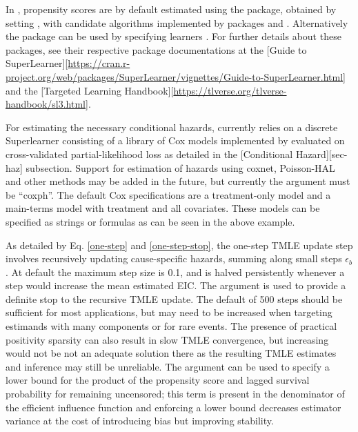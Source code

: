 In , propensity scores are by default estimated using the  package, obtained by setting , with candidate algorithms  implemented by packages  and . Alternatively the  package can be used by specifying learners . For further details about these packages, see their respective package documentations at the {[}Guide to SuperLearner{]}{[}\url{https://cran.r-project.org/web/packages/SuperLearner/vignettes/Guide-to-SuperLearner.html}{]} and the {[}Targeted Learning Handbook{]}{[}\url{https://tlverse.org/tlverse-handbook/sl3.html}{]}.

For estimating the necessary conditional hazards,  currently relies on a discrete Superlearner consisting of a library of Cox models implemented by  evaluated on cross-validated partial-likelihood loss as detailed in the {[}Conditional Hazard{]}{[}sec-haz{]} subsection. Support for estimation of hazards using coxnet, Poisson-HAL and other methods may be added in the future, but currently the  argument must be ``coxph''. The default Cox specifications are a treatment-only model and a main-terms model with treatment and all covariates. These models can be specified as strings or formulas as can be seen in the above example.

As detailed by Eq. \eqref{one-step} and \eqref{one-step-stop}, the one-step TMLE update step involves recursively updating cause-specific hazards, summing along small steps \(\epsilon_b\). At default the maximum step size is 0.1, and is halved persistently whenever a step would increase the mean estimated EIC. The  argument is used to provide a definite stop to the recursive TMLE update. The default of 500 steps should be sufficient for most applications, but may need to be increased when targeting estimands with many components or for rare events. The presence of practical positivity sparsity can also result in slow TMLE convergence, but increasing  would not be not an adequate solution there as the resulting TMLE estimates and inference may still be unreliable. The  argument can be used to specify a lower bound for the product of the propensity score and lagged survival probability for remaining uncensored; this term is present in the denominator of the efficient influence function and enforcing a lower bound decreases estimator variance at the cost of introducing bias but improving stability.

